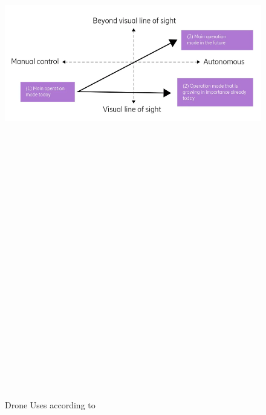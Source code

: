 \begin{figure}[ht]
    \label{fig:drone-uses}
    \includegraphics[width=15cm, height=50cm,keepaspectratio]{img/drone_uses.png}
    \caption{Drone Uses according to ~\cite{ericsson1}}
\end{figure}

